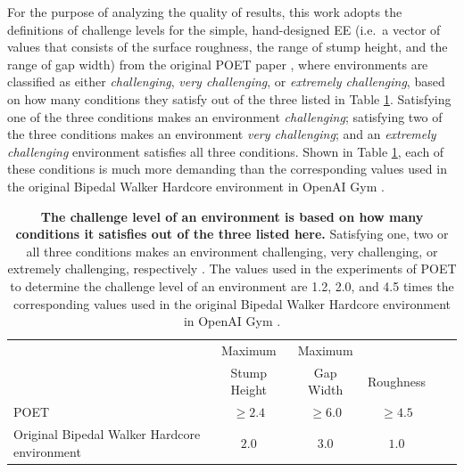 \documentclass{article}
\newcommand{\rwang}[1]{\comments{\textcolor{blue}{[Rui: #1]}}}
\newcommand{\comments}[1]{#1} %
\begin{document}
For the purpose of analyzing the quality of results, this work adopts the definitions of challenge levels for the simple, hand-designed EE (i.e.\ a vector of values that consists of the surface roughness, the range of stump height, and the range of gap width) from the original POET paper \cite{wang2019paired, wang2019poetGECCO}, where environments are classified as either \emph{challenging}, \emph{very challenging}, or \emph{extremely challenging},  based on how many conditions they satisfy out of the three listed in Table \ref{challenge-table}.
Satisfying one of the three conditions makes an environment \emph{challenging}; satisfying two of the three conditions makes an environment \emph{very challenging}; and an \emph{extremely challenging} environment satisfies all three conditions.
Shown in Table \ref{challenge-table}, each of these conditions is much more demanding than the corresponding values used in the original Bipedal Walker Hardcore environment \cite{OpenAI_bipedal} in OpenAI Gym \cite{brockman2016openai}.

\begin{table}[!ht]
\begin{center}
\begin{small}
\begin{sc}
\begin{tabular}{lccccc}
\hline
 & Maximum &  Maximum & \\
 & Stump Height & Gap Width & Roughness\\
\hline
POET & $\geq2.4$ & $\geq6.0$ &  $\geq4.5$\\
Original Bipedal Walker Hardcore environment & $2.0$ & $3.0$ & $1.0$\\
\hline
\end{tabular}
\end{sc}
\end{small}
\end{center}
\caption{\textbf{The challenge level of an environment is based on how many conditions it satisfies out of the three listed here.} Satisfying one, two or all three conditions makes an environment challenging, very challenging, or extremely challenging, respectively \cite{wang2019paired, wang2019poetGECCO}.  The values used in the experiments of POET to determine the challenge level of an environment are 1.2, 2.0, and 4.5 times the corresponding values used in the original Bipedal Walker Hardcore environment in OpenAI Gym \cite{OpenAI_bipedal}. %
\label{challenge-table}
}
\vskip -0.1in
\end{table}
\end{document}

